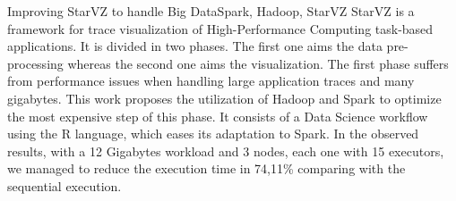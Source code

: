 \begin{abstract}
O StarVZ é um arcabouço para visualização de rastros de aplicações 
orientadas a tarefas no contexto de \textit{High-Performance Computing}. Ele é 
separado em duas fases, a primeira voltada para o pré-processamento dos dados e 
a segunda para a exibição. Essa primeira fase sofre de problemas de desempenho 
ao trabalhar com grandes volumes de dados. Este trabalho se propõe a utilizar o 
Hadoop e o Spark para otimizar o processamento mais custoso desta fase. Este 
consiste em um fluxo de Ciência de Dados utilizando a linguagem R, o que 
facilitou bastante sua portagem para manipulação de dados via Spark. Nos 
resultados observados utilizando uma carga de trabalho de 12 Gigabytes e 3 nós 
computacionais, cada um com 15 executores, chegamos a reduzir o tempo de 
execução em 74,11\% comparado com a execução sequencial.
\end{abstract}

\begin{englishabstract}{Improving StarVZ to handle Big Data}{Spark, 
Hadoop, StarVZ}
StarVZ is a framework for trace visualization of High-Performance Computing 
task-based applications. It is divided in two phases. The first one aims the 
data pre-processing whereas the second one aims the visualization. The 
first phase suffers from performance issues when handling large application 
traces and many gigabytes. This work proposes the utilization of Hadoop and 
Spark to optimize the most expensive step of this phase. It consists of a Data 
Science workflow using the R language, which eases its adaptation to Spark. In 
the observed results, with a 12 Gigabytes workload and 3 nodes, each one with 
15 executors, we managed to reduce the execution time in 74,11\% comparing with 
the sequential execution.
\end{englishabstract}

